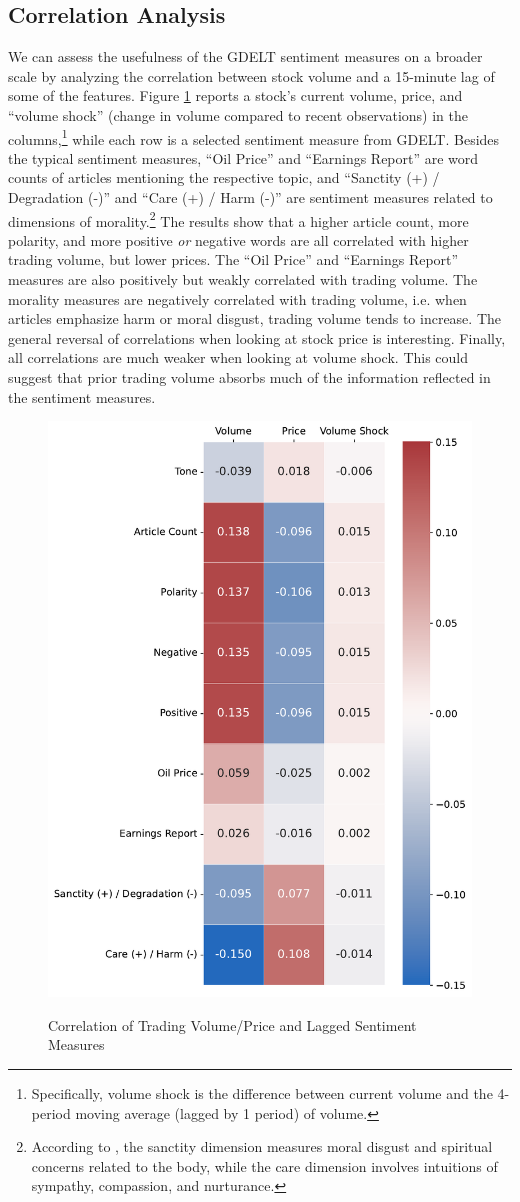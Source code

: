 \documentclass[12pt]{article}
\begin{document}
\subsection{Correlation Analysis}
We can assess the usefulness of the GDELT sentiment measures on a broader scale by analyzing the correlation between stock volume and a 15-minute lag of some of the features. Figure \ref{fig:lagged_volume} reports a stock's current volume, price, and ``volume shock'' (change in volume compared to recent observations) in the columns,\footnote{Specifically, volume shock is the difference between current volume and the 4-period moving average (lagged by 1 period) of volume.}  while each row is a selected sentiment measure from GDELT. Besides the typical sentiment measures, ``Oil Price'' and ``Earnings Report'' are word counts of articles mentioning the respective topic, and ``Sanctity (+) / Degradation (-)'' and ``Care (+) / Harm (-)'' are sentiment measures related to dimensions of morality.\footnote{According to \textcite{hopp2021extended}, the sanctity dimension measures moral disgust and spiritual concerns related to the body, while the care dimension involves intuitions of sympathy, compassion, and nurturance.} The results show that a higher article count, more polarity, and more positive \textit{or} negative words are all correlated with higher trading volume, but lower prices. The ``Oil Price'' and ``Earnings Report'' measures are also positively but weakly correlated with trading volume. The morality measures are negatively correlated with trading volume, i.e. when articles emphasize harm or moral disgust, trading volume tends to increase. The general reversal of correlations when looking at stock price is interesting. Finally, all correlations are much weaker when looking at  volume shock. This could suggest that prior trading volume absorbs much of the information reflected in the sentiment measures.

\begin{figure}[H]
    \centering
    \caption{Correlation of Trading Volume/Price and Lagged Sentiment Measures}
    \includegraphics[width=0.6\linewidth]{../Output/correlations.pdf}
    \label{fig:lagged_volume}
\end{figure}
\end{document}
